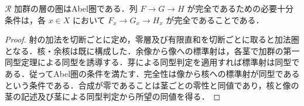 \begin{prop}[茎における完全性]
$\mathcal R$ 加群の層の圏はAbel圏である．列 $F\to G\to H$ が完全であるための必要十分条件は，各 $x\in X$ において $F_x\to G_x\to H_x$ が完全であることである．
\end{prop}
\begin{proof}
射の加法を切断ごとに定め，零層及び有限直和を切断ごとに取ると加法圏となる．核・余核は既に構成した．余像から像への標準射は，各茎で加群の第一同型定理による同型を誘導する．芽による同型判定を適用すれば標準射は同型である．従ってAbel圏の条件を満たす．完全性は像から核への標準射が同型であるという条件である．合成が零であることは茎ごとの零性と同値であり，核と像の茎の記述及び茎による同型判定から所望の同値を得る．
\end{proof}
